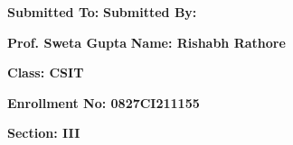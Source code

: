 \documentclass[12pt,,a4paper]{article}
\begin{document}







\vspace*{2cm}

\textbf{\fontsize{14}{\baselineskip}\selectfont Submitted To:} 
 \hspace{\fill} 
\textbf{\fontsize{14}{\baselineskip}\selectfont Submitted By:} 


\bigskip

\textbf{\fontsize{14}{\baselineskip}\selectfont Prof. Sweta Gupta}
\hspace{4cm}
\textbf{\fontsize{14}{\baselineskip}\selectfont Name: Rishabh Rathore}

\bigskip

\hspace{8cm}\textbf{\fontsize{14}{\baselineskip}\selectfont Class: CSIT}

\bigskip


\hspace{8cm}\textbf{\fontsize{14}{\baselineskip}\selectfont Enrollment No: 0827CI211155}

\bigskip

\hspace{8cm}\textbf{\fontsize{14}{\baselineskip}\selectfont Section: III}

\clearpage

\end{document}
